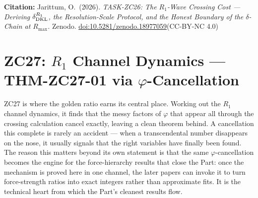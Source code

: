 \documentclass[12pt, a4paper]{article}
\begin{document}
\bigskip
\begin{center}
\textbf{Citation:} Jarittum, O.\ (2026).
\textit{TASK-ZC26: The $R_1$-Wave Crossing Cost ---
Deriving $\delta_{\rm DKL}^{R_1}$, the Resolution-Scale
Protocol, and the Honest Boundary of the $\delta$-Chain
at $R_{\max}$.}
Zenodo. \href{https://doi.org/10.5281/zenodo.18977059}%
{doi:10.5281/zenodo.18977059}\quad (CC-BY-NC 4.0)
\end{center}

\bigskip


\section{ZC27: $R_1$ Channel Dynamics --- THM-ZC27-01 via $\varphi$-Cancellation}
\label{sec:zc27-channel-dynamics}

ZC27 is where the golden ratio earns its central place. Working out the $R_1$
channel dynamics, it finds that the messy factors of $\varphi$ that appear all
through the crossing calculation cancel exactly, leaving a clean theorem behind.
A cancellation this complete is rarely an accident --- when a transcendental
number disappears on the nose, it usually signals that the right variables have
finally been found. The reason this matters beyond its own statement is that the
same $\varphi$-cancellation becomes the engine for the force-hierarchy results
that close the Part: once the mechanism is proved here in one channel, the later
papers can invoke it to turn force-strength ratios into exact integers rather
than approximate fits. It is the technical heart from which the Part's cleanest
results flow.
\end{document}
